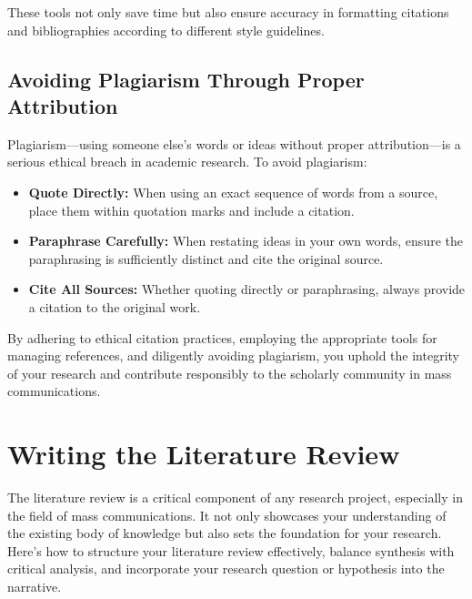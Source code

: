 \documentclass[
]{book}
\providecommand{\tightlist}{%
  \setlength{\itemsep}{0pt}\setlength{\parskip}{0pt}}
\begin{document}
These tools not only save time but also ensure accuracy in formatting citations and bibliographies according to different style guidelines.

\hypertarget{avoiding-plagiarism-through-proper-attribution}{%
\subsection*{Avoiding Plagiarism Through Proper Attribution}\label{avoiding-plagiarism-through-proper-attribution}}

Plagiarism---using someone else's words or ideas without proper attribution---is a serious ethical breach in academic research. To avoid plagiarism:

\begin{itemize}
\tightlist
\item
  \textbf{Quote Directly:} When using an exact sequence of words from a source, place them within quotation marks and include a citation.
\item
  \textbf{Paraphrase Carefully:} When restating ideas in your own words, ensure the paraphrasing is sufficiently distinct and cite the original source.
\item
  \textbf{Cite All Sources:} Whether quoting directly or paraphrasing, always provide a citation to the original work.
\end{itemize}

By adhering to ethical citation practices, employing the appropriate tools for managing references, and diligently avoiding plagiarism, you uphold the integrity of your research and contribute responsibly to the scholarly community in mass communications.

\hypertarget{writing-the-literature-review}{%
\section{Writing the Literature Review}\label{writing-the-literature-review}}

The literature review is a critical component of any research project, especially in the field of mass communications. It not only showcases your understanding of the existing body of knowledge but also sets the foundation for your research. Here's how to structure your literature review effectively, balance synthesis with critical analysis, and incorporate your research question or hypothesis into the narrative.
\end{document}
